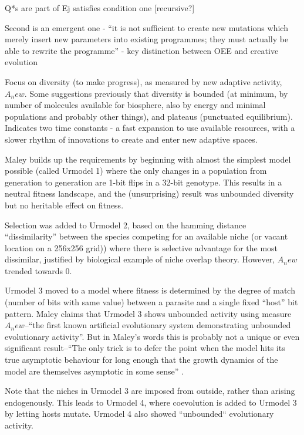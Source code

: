 \begin{NOTES}
Q*s are part of Ej satisfies condition one {[}recursive?{]}

Second is an emergent one - ``it is not sufficient to create new mutations which merely insert new parameters into existing programmes; they must actually be able to rewrite the programme''
- key distinction between OEE and creative evolution

\parencite{Maley1999}
Focus on diversity (to make progress), as measured by new adaptive activity, $A_new$. Some suggestions previously that diversity is bounded (at minimum, by number of molecules available for biosphere, also by energy and minimal populations and probably other things), and plateaus (punctuated equilibrium). Indicates two time constants - a fast expansion to use available resources, with a slower rhythm of innovations to create and enter new adaptive spaces.

Maley builds up the requirements by beginning with almost the simplest model possible (called Urmodel 1) where the only changes in a population from generation to generation are 1-bit flips in a 32-bit genotype. This results in a neutral fitness landscape, and the (unsurprising) result was unbounded diversity but no heritable effect on fitness.

Selection was added to Urmodel 2, based on the hamming distance ``dissimilarity'' between the species competing for an available niche (or vacant location on a 256x256 grid)) where there is selective advantage for the most dissimilar, justified by biological example of niche overlap theory. However, $A_new$ trended towards $0$.

Urmodel 3 moved to a model where fitness is determined by the degree of match (number of bits with same value) between a parasite and a single fixed ``host'' bit pattern. Maley claims that Urmodel 3 shows unbounded activity using measure $A_new$--``the first known artificial evolutionary system demonstrating unbounded evolutionary activity''. But in Maley's words this is probably not a unique or even significant result--``The only trick is to defer the point when the model hits its true asymptotic behaviour for long enough that the growth dynamics of the model are themselves asymptotic in some sense'' \parencite{Maley1999}.

Note that the niches in Urmodel 3 are imposed from outside, rather than arising endogenously. This leads to Urmodel 4, where coevolution is added to Urmodel 3 by letting hosts mutate. Urmodel 4 also showed ``unbounded`` evolutionary activity.


\end{NOTES}
